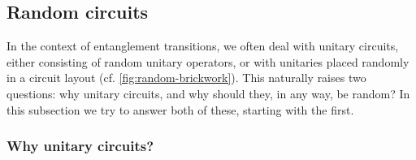 \subsection{Random circuits}

In the context of entanglement transitions, we often deal with unitary
circuits, either consisting of random unitary operators, or with unitaries
placed randomly in a circuit layout (cf. \cref{fig:random-brickwork}). This
naturally raises two questions: why unitary circuits, and why should they, in
any way, be random? In this subsection we try to answer both of these, starting
with the first.

\subsubsection{Why unitary circuits?}

